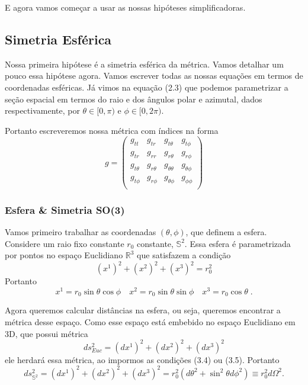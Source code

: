 \documentclass[11pt]{article}
\begin{document}
E agora vamos começar a usar as nossas hipóteses simplificadoras.

    \hypertarget{simetria-esfuxe9rica}{%
\subsection{Simetria Esférica}\label{simetria-esfuxe9rica}}

    Nossa primeira hipótese é a simetria esférica da métrica. Vamos detalhar
um pouco essa hipótese agora. Vamos escrever todas as nossas equações em
termos de coordenadas esféricas. Já vimos na equação (2.3) que podemos
parametrizar a seção espacial em termos do raio e dos ângulos polar e
azimutal, dados respectivamente, por \(\theta \in [0, \pi)\) e
\(\phi \in [0, 2\pi)\).

Portanto escreveremos nossa métrica com índices na forma
\[ \tag{3.4} g = 
\begin{pmatrix}
g_{tt} & g_{tr}& g_{t\theta} & g_{t\phi} \\
g_{tr} & g_{rr} & g_{r\theta} & g_{r \phi} \\
g_{t\theta} & g_{r \theta} & g_{\theta \theta} & g_{\theta \phi} \\
g_{t\phi} & g_{r \phi} & g_{\theta\phi} & g_{\phi\phi} \\
\end{pmatrix} \]

    \hypertarget{esfera-simetria-so3}{%
\subsubsection{Esfera \& Simetria SO(3)}\label{esfera-simetria-so3}}

    Vamos primeiro trabalhar as coordenadas \((\theta, \phi)\), que definem
a esfera. Considere um raio fixo constante \(r_0\) constante,
\(\mathbb{S}^2\). Essa esfera é parametrizada por pontos no espaço
Euclidiano \(\mathbb{R}^3\) que satisfazem a condição
\[\tag{3.5} (x^1)^2 + (x^2)^2 + (x^3)^2 = r_0^2 \] Portanto
\[ \tag{3.6} x^1 = r_0 \sin\theta \cos\phi\quad x^2 = r_0 \sin\theta \sin\phi\quad  x^3 = r_0 \cos\theta\; .\]

Agora queremos calcular distâncias na esfera, ou seja, queremos
encontrar a métrica desse espaço. Como esse espaço está embebido no
espaço Euclidiano em 3D, que possui métrica
\[ ds^2_{Euc} = (dx^1)^2 + (dx^2)^2 + (dx^3)^2 \] ele herdará essa
métrica, ao impormos as condições (3.4) ou (3.5). Portanto
\[ \tag{3.7} ds^2_{\mathbb{S}^2} = (dx^1)^2 + (dx^2)^2 + (dx^3)^2 = r_0^2 (d\theta^2 + \sin^2\theta d\phi^2) \equiv r_0^2  d\Omega^2.\]
\end{document}
